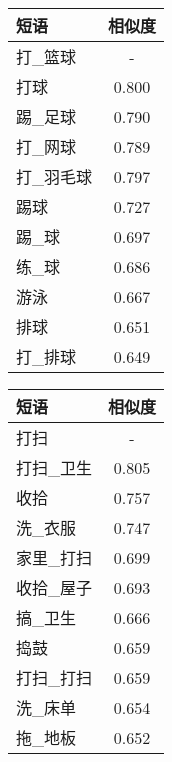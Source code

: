 \begin{table}[h]
\centering
\begin{subtable}{0.3\textwidth}
     \begin{tabular}{|l|c|} 
	\hline
	{\heiti 短语} & {\heiti 相似度} \\
	\hline
	打\_篮球 & - \\
	\hline
	打球 & 0.800 \\
	\hline
	踢\_足球 & 0.790 \\
	\hline
	打\_网球 & 0.789 \\
	\hline
	打\_羽毛球 & 0.797 \\
	\hline
	踢球 & 0.727 \\
	\hline
	踢\_球 & 0.697 \\
	\hline
	练\_球 & 0.686  \\
	\hline
	游泳 & 0.667 \\
	\hline
	排球 & 0.651 \\
	\hline
	打\_排球 & 0.649 \\
	\hline
	\end{tabular}
\end{subtable}
\hspace{1em}
\begin{subtable}{0.3\textwidth}
	\begin{tabular}{|l|c|} 
	\hline
	{\heiti 短语} & {\heiti 相似度} \\
	\hline
	打扫 & - \\
	\hline
	打扫\_卫生 & 0.805 \\
	\hline
	收拾 & 0.757 \\
	\hline
	洗\_衣服 & 0.747 \\
	\hline
	家里\_打扫 & 0.699 \\
	\hline
	收拾\_屋子 & 0.693 \\
	\hline
	搞\_卫生 & 0.666 \\
	\hline
	捣鼓 & 0.659 \\
	\hline
	打扫\_打扫 & 0.659 \\
	\hline
	洗\_床单 & 0.654 \\
	\hline
	拖\_地板 & 0.652 \\
	\hline
	\end{tabular}
\end{subtable}


\end{table}
